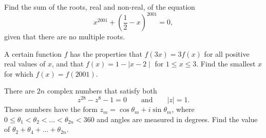 \documentclass[11pt]{article}
\theoremstyle{definition}
\begin{document}
\begin{question}[name={2001 AIME I, \href{https://artofproblemsolving.com/community/c4p384175}{Problem 3}}]
	Find the sum of the roots, real and non-real, of the equation $$x^{2001}+\left(\frac 12-x\right)^{2001}=0,$$ given that there are no multiple roots.
\end{question}


%	



















\begin{question}[name={2001 AIME II, \href{https://artofproblemsolving.com/community/c4p714302}{Problem 8}}]
	A certain function $f$ has the properties that $f(3x)=3f(x)$ for all positive real values of $x$, and that $f(x)=1-\mid x-2 \mid$ for $1\leq x \leq 3$. Find the smallest $x$ for which $f(x)=f(2001)$.
\end{question}


%	












\begin{question}[name={2001 AIME II, \href{https://artofproblemsolving.com/community/c4p714311}{Problem 14}}]
	There are $2n$ complex numbers that satisfy both $$z^{28}-z^{8}-1=0 \qquad \text{and} \qquad  |z|=1.$$ These numbers have the form $z_{m}=\cos\theta_{m}+i\sin\theta_{m}$, where $0\leq\theta_{1}<\theta_{2}< \dots <\theta_{2n}<360$ and angles are measured in degrees. Find the value of $\theta_{2}+\theta_{4}+\dots+\theta_{2n}$.	
	
\end{question}


%	
\end{document}
